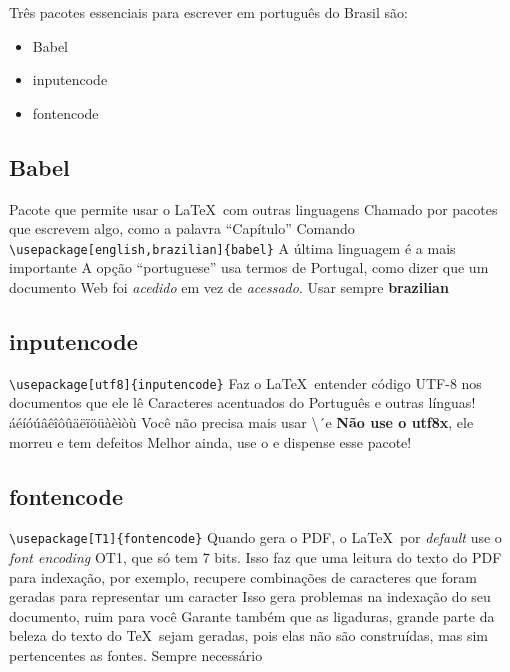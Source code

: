 Três pacotes essenciais para escrever em português do Brasil são:
\begin{itemize}
    \item Babel
    \item inputencode
    \item fontencode
\end{itemize}


\subsection{Babel}
    \begin{outline}
    \1 Pacote que permite usar o \LaTeX\ com outras linguagens
    \1 Chamado por pacotes que escrevem algo, como a palavra ``Capítulo''
    \1 Comando 
    \2 \lstinline|\usepackage[english,brazilian]{babel}|
    \2 A última linguagem é a mais importante
    \1 A opção ``portuguese'' usa termos de Portugal, como dizer que um documento Web foi \textit{acedido} em vez de \textit{acessado}.
    \1 Usar sempre \textbf{brazilian}
\end{outline}

\subsection{inputencode}
    \begin{outline}
        \1 \lstinline|\usepackage[utf8]{inputencode}|
        \1 Faz o \LaTeX\ entender código UTF-8 nos documentos que ele lê
        \2 Caracteres acentuados do Português e outras línguas!
        \3 áéíóúâêîôûäëïöüàèìòù
        \1 Você não precisa mais usar \textbackslash´e
        \1 \textbf{Não use o utf8x}, ele morreu e tem defeitos
        \1 Melhor ainda, use o  e dispense esse pacote!
    \end{outline}

\subsection{fontencode}
    \begin{outline}
        \1 \lstinline|\usepackage[T1]{fontencode}|
        \1 Quando gera o PDF, o \LaTeX\ por \textit{default} use o \textit{font encoding} OT1, que só tem 7 bits.
        \2 Isso faz que uma leitura do texto do PDF para indexação, por exemplo, recupere combinações de caracteres que foram geradas para representar um caracter
        \3 Isso gera problemas na indexação do seu documento, ruim para você
        \1 Garante também que as ligaduras, grande parte da beleza do texto do \TeX\ sejam geradas, pois elas não são construídas, mas sim pertencentes as fontes.
        \1 Sempre necessário
    \end{outline}

